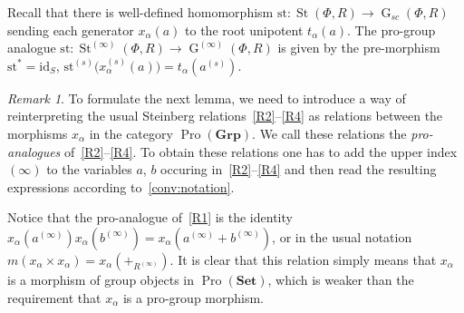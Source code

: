 \documentclass{article}
\numberwithin{equation}{section}
\theoremstyle{definition}
\theoremstyle{remark}
\newtheorem{rem}[lemma]{Remark}
\DeclareMathOperator\St{St}
\DeclareMathOperator\GG{G}
\DeclareMathOperator{\Pro}{Pro}
\newcommand{\Set}{\mathbf{Set}}
\newcommand{\Group}{\mathbf{Grp}}
\begin{document}

Recall that there is well-defined homomorphism $\mathrm{st}\colon \St(\Phi, R) \to \GG_{sc}(\Phi, R)$ sending each generator $x_\alpha(a)$ to the root unipotent $t_\alpha(a)$. The pro-group analogue \(\mathrm{st} \colon \St^{(\infty)}(\Phi, R) \to \GG^{(\infty)}(\Phi, R)\) is given by the pre-morphism \(\mathrm{st}^* = \mathrm{id}_S\), \(\mathrm{st}^{(s)}\bigl(x_{\alpha}^{(s)}(a)\bigr) = t_\alpha(a^{(s)})\). 


\begin{rem}
 To formulate the next lemma, we need to introduce a way of reinterpreting the usual Steinberg relations~\eqref{R2}--\eqref{R4} as relations between the morphisms $x_\alpha$ in the category $\Pro(\Group)$. We call these relations the {\it pro-analogues} of~\eqref{R2}--\eqref{R4}. To obtain these relations one has to add the upper index $(\infty)$ to the variables $a$, $b$ occuring in~\eqref{R2}--\eqref{R4} and then read the resulting expressions according to~\cref{conv:notation}. 
 
 Notice that the pro-analogue of~\eqref{R1} is the identity $x_\alpha(a^{(\infty)}) x_\alpha(b^{(\infty)}) = x_\alpha(a^{(\infty)} + b^{(\infty)})$, or in the usual notation $m (x_\alpha \times x_\alpha) = x_\alpha (+_{R^{(\infty)}})$. It is clear that this relation simply means that $x_\alpha$ is a morphism of group objects in $\Pro(\Set)$, which is weaker than the requirement that $x_\alpha$ is a pro-group morphism.
\end{rem}
\end{document}
